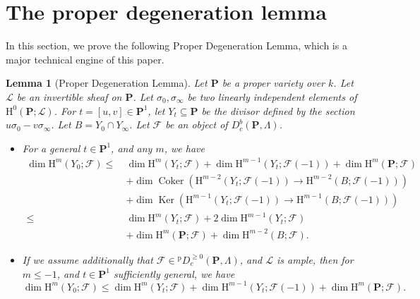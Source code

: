 \documentclass[english]{smfart}
\renewcommand{\mathbb}{\mathbf}
\renewcommand{\leq}{\leqslant}
\renewcommand{\geq}{\geqslant}
\renewcommand{\subset}{\subseteq}
\theoremstyle{remark}
\theoremstyle{plain}
\newtheorem{lemma}[remark]{Lemma}
\theoremstyle{definition}
\numberwithin{equation}{remark}
\theoremstyle{void}
\begin{document}
\renewcommand{\theremark}{\thesection.\arabic{remark}}


\section{The proper degeneration lemma}
\label{sec:proper-degeneration}

In this section, we prove the following Proper Degeneration
Lemma, which is a major technical engine of this paper.

\begin{lemma}[Proper Degeneration Lemma]%
\label{lemma:proper-degeneration}
Let \(\mathbb{P}\) be a proper variety over \(k\).  Let
\(\mathscr{L}\) be an invertible sheaf on \(\mathbb{P}\).  Let
\(\sigma_{0}, \sigma_{\infty}\) be two linearly independent elements
of \(\mathrm{H}^{0}(\mathbb{P};\mathscr{L})\).  For
\(t=[u,v] \in \mathbb{P}^{1}\), let \(Y_t \subset \mathbb{P}\) be the divisor
defined by the section \(u\sigma_{0}-v\sigma_{\infty}\).  Let
\(B = Y_{0} \cap Y_{\infty}\).  Let \(\mathcal{F}\) be an object of
\(D^b_c(\mathbb{P},\Lambda)\).
\begin{itemize}
\item For a general \(t \in \mathbb{P}^{1}\), and
any \(m\), we have
\begin{align}\label{eq:estimate-ineq}
  \dim  \mathrm{H}^{m}(Y_0;\mathcal{F}) \leq
  \ & \dim \mathrm{H}^{m}(Y_t;\mathcal{F}) +
      \dim \mathrm{H}^{m-1}(Y_t;\mathcal{F}(-1)) + \dim \mathrm{H}^{m}(\mathbb{P};\mathcal{F}) \\
    &+ \dim \operatorname{Coker}(\mathrm{H}^{m-2}(Y_{t};\mathcal{F}(-1)) \to \mathrm{H}^{m-2}(B;\mathcal{F}(-1))) \nonumber
  \\ \nonumber
    &+ \dim \operatorname{Ker}(\mathrm{H}^{m-1}(Y_{t};\mathcal{F}(-1)) \to \mathrm{H}^{m-1}(B;\mathcal{F}(-1)))\\\nonumber
  \leq\ & \dim \mathrm{H}^{m}(Y_{t};\mathcal{F})
          + 2\dim \mathrm{H}^{m-1}(Y_{t};\mathcal{F}) \\
         & + \dim \mathrm{H}^{m}(\mathbb{P};\mathcal{F})
          + \dim \mathrm{H}^{m-2}(B;\mathcal{F}). \nonumber
\end{align}
\item
If we assume additionally that
\(\mathcal{F} \in {}^{\mathrm{p}}D_{c}^{\geq0}(\mathbb{P},\Lambda)\), and
\(\mathscr{L}\) is ample, then for \(m \leq -1\), and
\(t \in \mathbb{P}^{1}\) sufficiently general, we have
\begin{equation}\label{eq:proposition}
\dim \mathrm{H}^{m}(Y_{0};\mathcal{F}) \leq
\dim \mathrm{H}^{m}(Y_{t};\mathcal{F}) +
\dim \mathrm{H}^{m-1}(Y_{t};\mathcal{F}(-1)) +
\dim \mathrm{H}^{m}(\mathbb{P};\mathcal{F}).
\end{equation}
\end{itemize}
\end{lemma}
\end{document}
